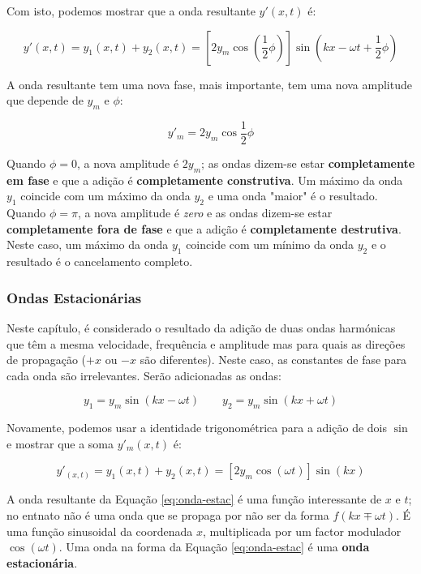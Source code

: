 Com isto, podemos mostrar que a onda resultante $y'(x,t)$ é:

\begin{equation}
    y'(x,t)=y_1(x,t)+y_2(x,t)=[2y_m\cos(\frac{1}{2}\phi)]\sin(kx-\omega t + \frac{1}{2}\phi)
\end{equation}

A onda resultante tem uma nova fase, mais importante, tem uma nova amplitude que depende de $y_m$ e $\phi$:

\begin{equation}
    y'_m=2y_m\cos\frac{1}{2}\phi
\end{equation}

Quando $\phi=0$, a nova amplitude é $2y_m$; as ondas dizem-se estar \textbf{completamente em fase} e que a adição é \textbf{completamente construtiva}. Um máximo da onda $y_1$ coincide com um máximo da onda $y_2$ e uma onda "maior" é o resultado.
Quando $\phi=\pi$, a nova amplitude é \emph{zero} e as ondas dizem-se estar \textbf{completamente fora de fase} e que a adição é \textbf{completamente destrutiva}. Neste caso, um máximo da onda $y_1$ coincide com um mínimo da onda $y_2$ e o resultado é o cancelamento completo.

\subsubsection{Ondas Estacionárias}
Neste capítulo, é considerado o resultado da adição de duas ondas harmónicas que têm a mesma velocidade, frequência e amplitude mas para quais as direções de propagação ($+x$ ou $-x$ são diferentes). Neste caso, as constantes de fase para cada onda são irrelevantes. Serão adicionadas as ondas:

\begin{equation}
    y_1=y_m\sin(kx-\omega t) \qquad y_2=y_m\sin(kx+\omega t)
\end{equation}

Novamente, podemos usar a identidade trigonométrica para a adição de dois $\sin$ e mostrar que a soma $y'_m(x,t)$ é:

\begin{equation}\label{eq:onda-estac}
    y'_(x,t)=y_1(x,t)+y_2(x,t)=[2y_m\cos(\omega t)]\sin(kx)
\end{equation}

A onda resultante da Equação \ref{eq:onda-estac} é uma função interessante de $x$ e $t$; no entnato não é uma onda que se propaga por não ser da forma $f(kx\mp\omega t)$. É uma função sinusoidal da coordenada $x$, multiplicada por um factor modulador $\cos(\omega t)$. Uma onda na forma da Equação \ref{eq:onda-estac} é uma \textbf{onda estacionária}.

